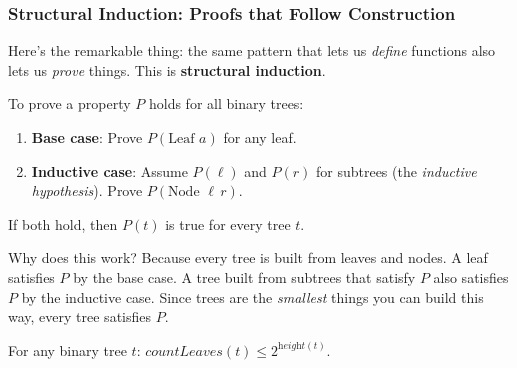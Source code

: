 \subsubsection*{Structural Induction: Proofs that Follow Construction}

Here's the remarkable thing: the same pattern that lets us \emph{define} functions also lets us \emph{prove} things. This is \textbf{structural induction}.

\begin{keyresult}
To prove a property $P$ holds for all binary trees:
\begin{enumerate}
  \item \textbf{Base case}: Prove $P(\text{Leaf } a)$ for any leaf.
  \item \textbf{Inductive case}: Assume $P(\ell)$ and $P(r)$ for subtrees (the \emph{inductive hypothesis}). Prove $P(\text{Node } \ell\, r)$.
\end{enumerate}
If both hold, then $P(t)$ is true for every tree $t$.
\end{keyresult}

Why does this work? Because every tree is built from leaves and nodes. A leaf satisfies $P$ by the base case. A tree built from subtrees that satisfy $P$ also satisfies $P$ by the inductive case. Since trees are the \emph{smallest} things you can build this way, every tree satisfies $P$.

\begin{theorem}
For any binary tree $t$: $\textit{countLeaves}(t) \leq 2^{\textit{height}(t)}$.
\end{theorem}

